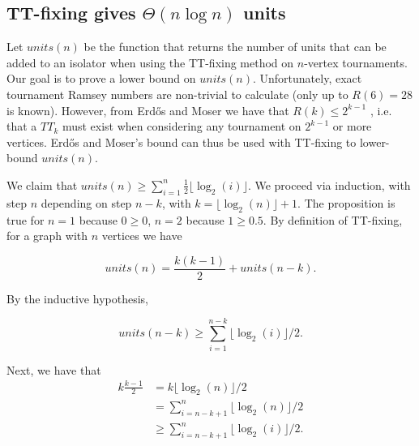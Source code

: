 \documentclass[conference]{IEEEtran}
\begin{document}




\subsection{TT-fixing gives $\Theta(n\log n)$ units}
Let $units(n)$ be the function that returns the number of units that can be added to an isolator when using the TT-fixing method on $n$-vertex tournaments. Our goal is to prove a lower bound on $units(n)$. Unfortunately, exact tournament Ramsey numbers are non-trivial to calculate (only up to $R(6) = 28$ is known). However, from Erd\H{o}s and Moser  we have that $R(k) \leq 2^{k-1}$ \cite{ref_erdos_ramsey_bounds}, i.e. that a $TT_{k}$ must exist when considering any tournament on $2^{k-1}$ or more vertices. Erd\H{o}s and Moser's bound can thus be used with TT-fixing to lower-bound $units(n)$.

We claim that $units(n) \geq \sum\limits_{i=1}^n \frac{1}{2} \lfloor \log_2(i) \rfloor$. We proceed via induction, with step $n$ depending on step $n-k$, with $k=\lfloor \log_2(n)\rfloor + 1$. The proposition is true for $n=1$ because $0 \geq 0$, $n=2$ because $ 1 \geq 0.5$.  By definition of TT-fixing, for a graph with $n$ vertices we have 

\begin{equation}\label{unitsndef}
units(n) = \frac{k(k-1)}{2}  + units(n-k).
\end{equation} 

By the inductive hypothesis,

 \begin{equation}\label{unitsIH}
 units(n-k) \geq \sum\limits_{i=1}^{n-k} \lfloor \log_2(i)\rfloor/2.
 \end{equation}
 
 Next, we have that 
 \begin{align}
  k\frac{k-1}{2} &= k \lfloor \log_2(n)\rfloor/2 \nonumber \\
   &= \sum\limits_{i=n-k+1}^{n} \lfloor \log_2(n)\rfloor/2 \nonumber \\
  &\geq \sum\limits_{i=n-k+1}^{n} \lfloor \log_2(i)\rfloor/2  \label{unitsk}.
 \end{align}
 
\end{document}
